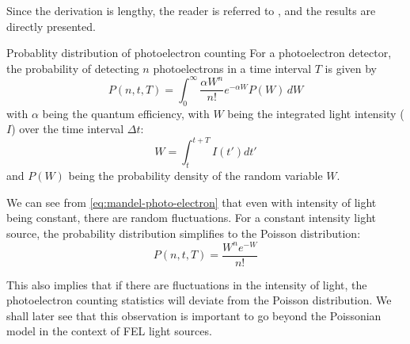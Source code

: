 Since the derivation is lengthy, the reader is referred to \cite{mehtaVIIITheoryPhotoelectron1970}, and the results are directly presented.
\begin{note}
    {Probablity distribution of photoelectron counting}
    For a photoelectron detector, the probability of detecting $n$ photoelectrons in a time interval $T$ is given by
    \begin{equation}\label{eq:mandel-photo-electron}
        P(n, t, T) = \int_{0}^{\infty} \frac{\alpha W^n}{n!} e^{-\alpha W} P(W) \, dW
    \end{equation}
    with $\alpha$ being the quantum efficiency, with $W$ being the integrated light intensity ($I$) over the time interval $\Delta t$:
    \begin{equation}
        W = \int_{t}^{t+T} I(t') dt'
    \end{equation}
    and $P(W)$ being the probability density of the random variable $W$.
\end{note}

We can see from \ref{eq:mandel-photo-electron} that even with intensity of light being constant, there are random fluctuations. For a constant intensity light source, the probability distribution simplifies to the Poisson distribution:
\begin{equation}
    P(n, t, T) = \frac{W^n e^{-W}}{n!} 
\end{equation}

This also implies that if there are fluctuations in the intensity of light, the photoelectron counting statistics will deviate from the Poisson distribution. We shall later see that this observation is important to go beyond the Poissonian model in the context of \gls{FEL} light sources.






